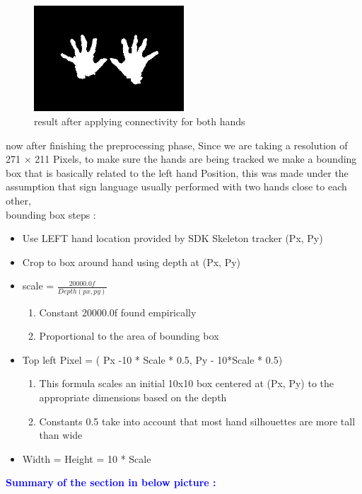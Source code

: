  \begin{figure}[H]
\centering
\includegraphics[width=0.5\textwidth]{img/twohands.jpg}
\caption{result after applying connectivity for both hands  }
\label{fig:twohd}
\end{figure}
now after finishing  the preprocessing phase, Since we are taking a resolution of 271 $\times$ 211 Pixels, to make sure the hands are being tracked we make a bounding box that is basically related to the left hand Position, this was made under the assumption that sign language  usually performed with two hands close to each other, \\
bounding box steps : 
\begin{itemize}
\item  Use LEFT hand location provided by SDK Skeleton  tracker (Px, Py)
 \item Crop to box around hand using depth at (Px, Py)
    \item scale = $\frac{20000.0f}{Depth(px,py)}$ 
    \begin{enumerate}
    \item Constant 20000.0f  found empirically
    \item Proportional to the area of bounding box 
    \end{enumerate}
\item Top left Pixel  = ( Px -10 * Scale * 0.5, Py - 10*Scale * 0.5)
\begin{enumerate}
    \item This formula scales an initial 10x10 box centered at (Px, Py) to
the appropriate dimensions based on the depth 
    \item Constants 0.5  take into account that most hand
silhouettes are more tall than wide 
    \end{enumerate}
   \item Width = Height = 10 * Scale 
\end{itemize}

\textcolor{blue}{\textbf{Summary of the section in below picture :} }

